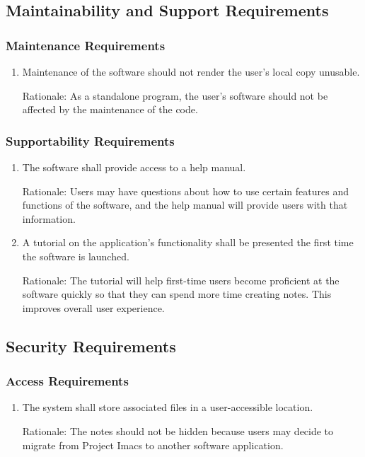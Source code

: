 \documentclass{article}
\begin{document}
\subsection{Maintainability and Support Requirements}
\subsubsection{Maintenance Requirements}
\begin{enumerate}[MR1]
\item Maintenance of the software should not render the user's local copy unusable.

Rationale: As a standalone program, the user's software should not be affected by the maintenance of the code.
\end{enumerate}

\subsubsection{Supportability Requirements}
\begin{enumerate}[SUR1]
\item The software shall provide access to a help manual.

Rationale: Users may have questions about how to use certain features and functions of the software, and the help manual will provide users with that information.
\item A tutorial on the application's functionality shall be presented the first time the software is launched.

Rationale: The tutorial will help first-time users become proficient at the software quickly so that they can spend more time creating notes. This improves overall user experience.
\end{enumerate}

\subsection{Security Requirements}
\subsubsection{Access Requirements}
\begin{enumerate}[{A}CR1]
\item The system shall store associated files in a user-accessible location.

Rationale: The notes should not be hidden because users may decide to migrate from Project Imacs to another software application.
\end{enumerate}
\end{document}
